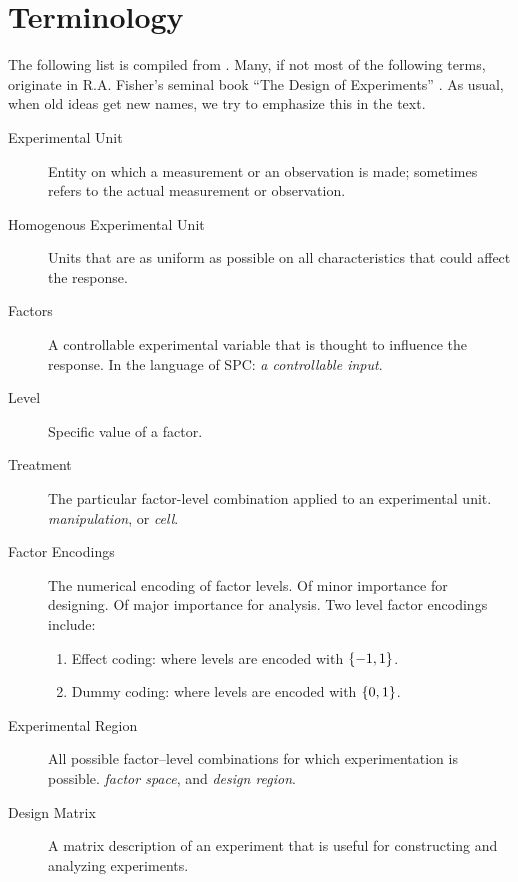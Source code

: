 \section{Terminology}
The following list is compiled from \cite{mason_statistical_2003}. Many, if not most of the following terms, originate in R.A. Fisher's seminal book ``The Design of Experiments'' \citep{fisher_design_1960}. As usual, when old ideas get new names, we try to emphasize this in the text.



\begin{description}

\item [Experimental Unit]  Entity on which a measurement or an observation is made;
sometimes refers to the actual measurement or observation.
\item [Homogenous Experimental Unit] Units that are as uniform as possible on all characteristics that could affect the response.

\item [Factors]  A controllable experimental variable that is thought to influence the response. In the language of SPC: \emph{a controllable input}.

\item [Level] Specific value of a factor.

\item[Treatment] The particular factor-level combination applied to an experimental unit. \Aka \emph{manipulation}, or \emph{cell}.

\item [Factor Encodings] The numerical encoding of factor levels.
Of minor importance for designing. Of major importance for analysis.
Two level factor encodings include:
\begin{enumerate}
\item Effect coding: where levels are encoded with $\{ -1,1 \}$.
\item Dummy coding: where levels are encoded with $\{ 0,1 \}$.
\end{enumerate}

\item [Experimental Region] All possible factor–level combinations for which experimentation is possible. \Aka \emph{factor space}, and \emph{design region}.

\item [Design Matrix] A matrix description of an experiment that is useful for constructing and analyzing experiments.


\end{description}
